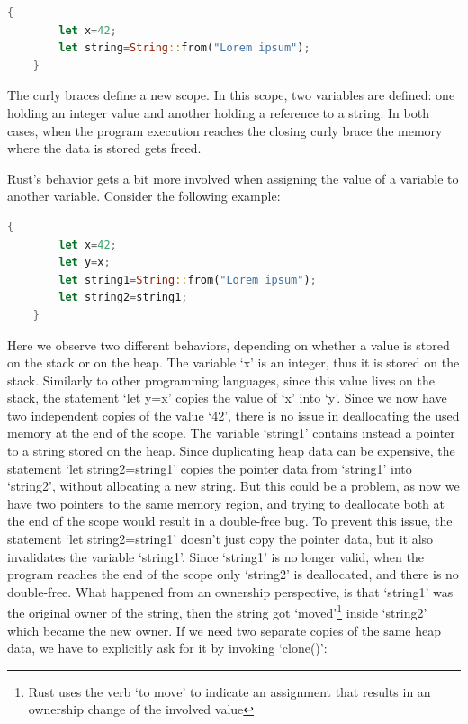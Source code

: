 \documentclass{report}
\begin{document}
\begin{lstlisting}[language=Rust, style=colouredRust]
	{
		let x=42;
		let string=String::from("Lorem ipsum");
	}
\end{lstlisting}

The curly braces define a new scope. In this scope, two variables are defined: one holding an integer value and another holding a reference to a string. In both cases, when the
program execution reaches the closing curly brace the memory where the data is stored gets freed. \par
Rust's behavior gets a bit more involved when assigning the value of a variable to another variable. Consider the following example:

\begin{lstlisting}[language=Rust, style=colouredRust]
	{
		let x=42;
		let y=x;
		let string1=String::from("Lorem ipsum");
		let string2=string1;
	}
\end{lstlisting}

Here we observe two different behaviors, depending on whether a value is stored on the stack or on the heap. The variable \enquote*{x} is an integer, thus it is stored on the
stack. Similarly to other programming languages, since this value lives on the stack, the statement \enquote*{let y=x} copies the value of \enquote*{x} into \enquote*{y}. Since we
now have two independent copies of the value \enquote*{42}, there is no issue in deallocating the used memory at the end of the scope. The variable \enquote*{string1} contains instead
a pointer to a string stored on the heap. Since duplicating heap data can be expensive, the statement \enquote*{let string2=string1} copies the pointer data from
\enquote*{string1} into \enquote*{string2}, without allocating a new string. But this could be a problem, as now we have two pointers to the same memory region, and trying to deallocate both at the end of the
scope would result in a double-free bug. To prevent this issue, the statement \enquote*{let string2=string1} doesn't just copy the pointer data, but it also invalidates the
variable \enquote*{string1}. Since \enquote*{string1} is no longer valid, when the program reaches the end of the scope only \enquote*{string2} is deallocated, and there is no
double-free. What happened from an ownership perspective, is that \enquote*{string1} was the original owner of the string, then the string got \enquote*{moved}\footnote{Rust uses
the verb \enquote*{to move} to indicate an assignment that results in an ownership change of the involved value} inside \enquote*{string2} which
became the new owner. If we need two separate copies of the same heap data, we have to explicitly ask for it by invoking \enquote*{clone()}:
\end{document}

